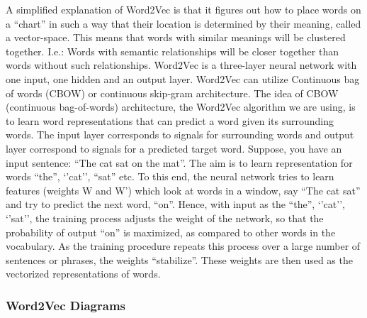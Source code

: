 \documentclass[11pt]{article}
\begin{document}
A simplified explanation of Word2Vec is that it figures out how to place
words on a ``chart'' in such a way that their location is determined by
their meaning, called a vector-space. This means that words with similar
meanings will be clustered together. I.e.: Words with semantic
relationships will be closer together than words without such
relationships. Word2Vec is a three-layer neural network with one input,
one hidden and an output layer. Word2Vec can utilize Continuous bag of
words (CBOW) or continuous skip-gram architecture. The idea of CBOW
(continuous bag-of-words) architecture, the Word2Vec algorithm we are
using, is to learn word representations that can predict a word given
its surrounding words. The input layer corresponds to signals for
surrounding words and output layer correspond to signals for a predicted
target word. Suppose, you have an input sentence: ``The cat sat on the
mat''. The aim is to learn representation for words ``the'', `'cat'',
``sat'' etc. To this end, the neural network tries to learn features
(weights W and W') which look at words in a window, say ``The cat sat''
and try to predict the next word, ``on''. Hence, with input as the
``the'', `'cat'', `'sat'', the training process adjusts the weight of
the network, so that the probability of output ``on'' is maximized, as
compared to other words in the vocabulary. As the training procedure
repeats this process over a large number of sentences or phrases, the
weights ``stabilize''. These weights are then used as the vectorized
representations of words.

\hypertarget{word2vec-diagrams}{%
\subsubsection{Word2Vec Diagrams}\label{word2vec-diagrams}}
\end{document}
